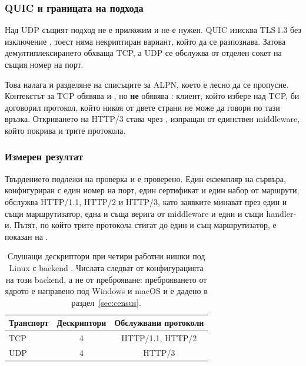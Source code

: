 \subsubsection{QUIC и границата на подхода}

Над UDP същият подход не е приложим и не е нужен. QUIC изисква TLS\,1.3 без изключение
\cite{rfc9001}, тоест няма некриптиран вариант, който да се разпознава. Затова
демултиплексирането обхваща TCP, а UDP се обслужва от отделен сокет на същия номер на
порт.

Това налага и разделяне на списъците за ALPN, което е лесно да се пропусне. Контекстът за
TCP обявява  и , но \textbf{не} обявява : клиент, който
избере  над TCP, би договорил протокол, който никоя от двете страни не може да
говори по тази връзка. Откриването на HTTP/3 става чрез  \cite{rfc7838},
изпращан от единствен middleware, който покрива и трите протокола.

\subsubsection{Измерен резултат}

Твърдението подлежи на проверка и е проверено. Един екземпляр на сървъра, конфигуриран с
един номер на порт, един сертификат и един набор от маршрути, обслужва HTTP/1.1, HTTP/2 и
HTTP/3, като заявките минават през един и същи маршрутизатор, една и съща верига от
middleware и едни и същи handler-и. Пътят, по който трите протокола стигат до един и същ маршрутизатор, е показан на .



\begin{table}[H]
\centering
\caption{Слушащи дескриптори при четири работни нишки под Linux с backend
. Числата следват от конфигурацията на този backend, а не от преброяване:
преброяването от ядрото е направено под Windows и macOS и е дадено в
раздел~\ref{sec:census}.}
\label{tab:descriptors-arch}
\begin{tabular}{@{}lcc@{}}
\toprule
\textbf{Транспорт} & \textbf{Дескриптори} & \textbf{Обслужвани протоколи} \\
\midrule
TCP & 4 & HTTP/1.1, HTTP/2 \\
UDP & 4 & HTTP/3 \\
\bottomrule
\end{tabular}
\end{table}

